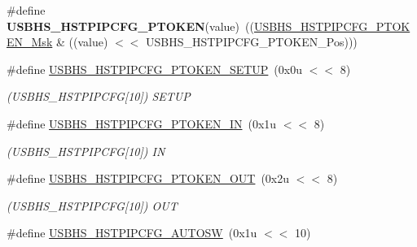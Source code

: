 \begin{DoxyCompactItemize}
\mbox{\label{group__SAMV71__USBHS_ga7d1b0be21cfe8f04388bcd96aa50b952}} 
\#define {\bfseries U\+S\+B\+H\+S\+\_\+\+H\+S\+T\+P\+I\+P\+C\+F\+G\+\_\+\+P\+T\+O\+K\+EN}(value)~((\mbox{\hyperlink{group__SAMV71__USBHS_ga9160ad51dac584e665f3ff920817ff34}{U\+S\+B\+H\+S\+\_\+\+H\+S\+T\+P\+I\+P\+C\+F\+G\+\_\+\+P\+T\+O\+K\+E\+N\+\_\+\+Msk}} \& ((value) $<$$<$ U\+S\+B\+H\+S\+\_\+\+H\+S\+T\+P\+I\+P\+C\+F\+G\+\_\+\+P\+T\+O\+K\+E\+N\+\_\+\+Pos)))
\item 
\mbox{\label{group__SAMV71__USBHS_ga13977671c7a6080fe0a24e1fa20b55b2}} 
\#define \mbox{\hyperlink{group__SAMV71__USBHS_ga13977671c7a6080fe0a24e1fa20b55b2}{U\+S\+B\+H\+S\+\_\+\+H\+S\+T\+P\+I\+P\+C\+F\+G\+\_\+\+P\+T\+O\+K\+E\+N\+\_\+\+S\+E\+T\+UP}}~(0x0u $<$$<$ 8)
\begin{DoxyCompactList}\small\item\em (U\+S\+B\+H\+S\+\_\+\+H\+S\+T\+P\+I\+P\+C\+FG\mbox{[}10\mbox{]}) S\+E\+T\+UP \end{DoxyCompactList}\item 
\mbox{\label{group__SAMV71__USBHS_ga05aed341b46e5deb78532b4e66ad3170}} 
\#define \mbox{\hyperlink{group__SAMV71__USBHS_ga05aed341b46e5deb78532b4e66ad3170}{U\+S\+B\+H\+S\+\_\+\+H\+S\+T\+P\+I\+P\+C\+F\+G\+\_\+\+P\+T\+O\+K\+E\+N\+\_\+\+IN}}~(0x1u $<$$<$ 8)
\begin{DoxyCompactList}\small\item\em (U\+S\+B\+H\+S\+\_\+\+H\+S\+T\+P\+I\+P\+C\+FG\mbox{[}10\mbox{]}) IN \end{DoxyCompactList}\item 
\mbox{\label{group__SAMV71__USBHS_ga0c650ad1cdbe06feef020ac64286b834}} 
\#define \mbox{\hyperlink{group__SAMV71__USBHS_ga0c650ad1cdbe06feef020ac64286b834}{U\+S\+B\+H\+S\+\_\+\+H\+S\+T\+P\+I\+P\+C\+F\+G\+\_\+\+P\+T\+O\+K\+E\+N\+\_\+\+O\+UT}}~(0x2u $<$$<$ 8)
\begin{DoxyCompactList}\small\item\em (U\+S\+B\+H\+S\+\_\+\+H\+S\+T\+P\+I\+P\+C\+FG\mbox{[}10\mbox{]}) O\+UT \end{DoxyCompactList}\item 
\mbox{\label{group__SAMV71__USBHS_ga4c8f6bdfed56e18995257f9d6285e70b}} 
\#define \mbox{\hyperlink{group__SAMV71__USBHS_ga4c8f6bdfed56e18995257f9d6285e70b}{U\+S\+B\+H\+S\+\_\+\+H\+S\+T\+P\+I\+P\+C\+F\+G\+\_\+\+A\+U\+T\+O\+SW}}~(0x1u $<$$<$ 10)
$$
\end{DoxyCompactItemize}
